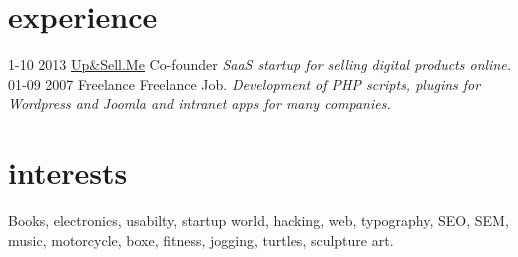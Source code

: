 \documentclass[print]{cv}
\begin{document}
\section{experience}

\begin{entrylist}
  \entry
    {1-10 2013}
     {\href{http://www.upandsell.me}{Up\&Sell.Me}}
    {Co-founder}
    {\emph{SaaS startup for selling digital products online. }}
  \entry
    {01-09 2007}
    {Freelance}
    {Freelance Job.}
    {\emph{Development of PHP scripts, plugins for Wordpress and Joomla and intranet apps for many companies.}}
\end{entrylist}

\section{interests}

Books, electronics, usabilty, startup world, hacking, web, typography, SEO, SEM, music, motorcycle, boxe, fitness, jogging,
turtles, sculpture art.
\end{document}
